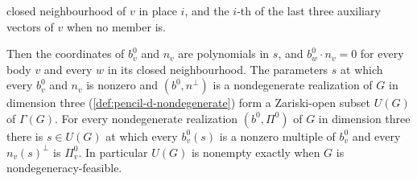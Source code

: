 \begin{lemma}
\begin{itemize}
      closed neighbourhood of $v$ in place $i$, and the $i$-th of the last
      three auxiliary vectors of $v$ when no member is.
  \end{itemize}
  Then the coordinates of $b^0_v$ and $n_v$ are polynomials in $s$, and
  $b^0_w \cdot n_v = 0$ for every body $v$ and every $w$ in its closed
  neighbourhood. The parameters $s$ at which every $b^0_v$ and $n_v$ is
  nonzero and $(b^0, n^{\perp})$ is a nondegenerate realization of $G$ in
  dimension three (\cref{def:pencil-d-nondegenerate}) form a Zariski-open
  subset $U(G)$ of $\Gamma(G)$. For every nondegenerate realization
  $(b^0, \Pi^0)$ of $G$ in dimension three there is $s \in U(G)$ at which
  every $b^0_v(s)$ is a nonzero multiple of $b^0_v$ and every
  $n_v(s)^{\perp}$ is $\Pi^0_v$. In particular $U(G)$ is nonempty exactly
  when $G$ is nondegeneracy-feasible.
\end{lemma}
